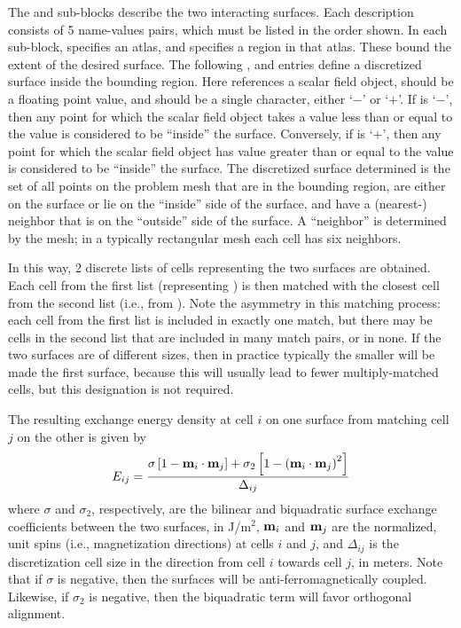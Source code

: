 \begin{itemize}
\begin{description}
   The  and  sub-blocks describe
   the two interacting surfaces.  Each description consists of 5
   name-values pairs, which must be listed in the order shown.  In each
   sub-block,  specifies an atlas, and
    specifies a region in that atlas.  These bound
   the extent of the desired surface.  The following
   ,  and
    entries define a discretized surface inside the
   bounding region.  Here  references a scalar
   field object,  should be a floating point value,
   and  should be a single character, either `$-$' or
   `$+$'.  If  is `$-$', then any point for which the
   scalar field object takes a value less than or equal to the
    value is considered to be ``inside'' the surface.
   Conversely, if  is `$+$', then any point for which the
   scalar field object has value greater than or equal to the
    value is considered to be ``inside'' the surface.
   The discretized surface determined is the set of all points on the
   problem mesh that are in the bounding region, are either on the
   surface or lie on the ``inside'' side of the surface, and have a
   (nearest-) neighbor that is on the ``outside'' side of the surface.
   A ``neighbor'' is determined by the mesh; in a typically rectangular
   mesh each cell has six neighbors.

   In this way, 2 discrete lists of cells representing the two
   surfaces are obtained.  Each cell from the first list (representing
   ) is then matched with the closest cell from the
   second list (i.e., from ).  Note the asymmetry in
   this matching process: each cell from the first list is included in
   exactly one match, but there may be cells in the second list that
   are included in many match pairs, or in none.  If the two surfaces
   are of different sizes, then in practice typically the smaller will
   be made the first surface, because this will usually lead to fewer
   multiply-matched cells, but this designation is not required.

   The resulting exchange energy density at cell $i$ on one surface
   from matching cell $j$ on the other is given by
   \begin{displaymath}
        E_{ij} =  \frac{\sigma\left[1-\textbf{m}_i\cdot\textbf{m}_j\right]
         +\sigma_2\left[1-\left(\textbf{m}_i\cdot\textbf{m}_j\right)^2\right]
        }{\Delta_{ij}}
   \end{displaymath}
   where $\sigma$ and $\sigma_2$, respectively, are the bilinear and
   biquadratic surface exchange coefficients between the two surfaces,
   in J/m${}^2$, $\textbf{m}_i$ and $\textbf{m}_j$ are the normalized, unit spins
   (i.e., magnetization directions) at cells $i$ and $j$, and
   $\Delta_{ij}$ is the discretization cell size in the direction from
   cell $i$ towards cell $j$, in meters.  Note that if $\sigma$ is
   negative, then the surfaces will be anti-ferromagnetically coupled.
   Likewise, if $\sigma_2$ is negative, then the biquadratic term will
   favor orthogonal alignment.


\end{description}
\end{itemize}
